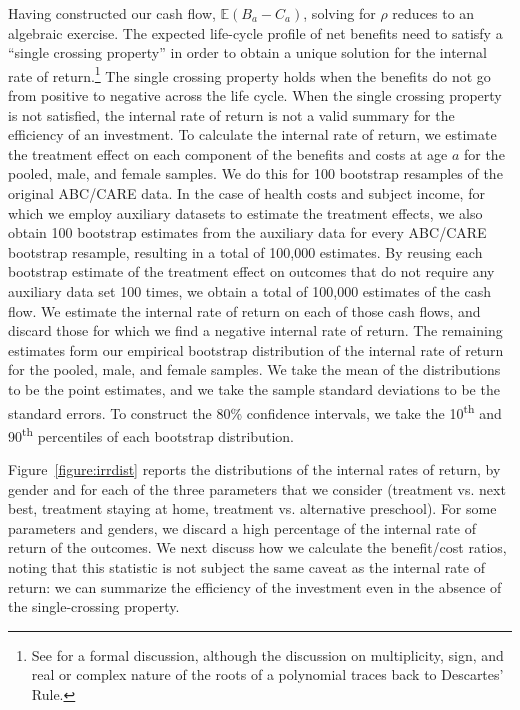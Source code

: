 \noindent Having constructed our cash flow, $\mathbb{E} (B_a - C_a)$, solving for $\rho$ reduces to an algebraic exercise. The expected life-cycle profile of net benefits need to satisfy a ``single crossing property'' in order to obtain a unique solution for the internal rate of return.\footnote{See \citet{Arrow-Levhari_1969_EJ} for a formal discussion, although the discussion on multiplicity, sign, and real or complex nature of the roots of a polynomial traces back to Descartes' Rule.} The single crossing property holds when the benefits do not go from positive to negative across the life cycle. When the single crossing property is not satisfied, the internal rate of return is not a valid summary for the efficiency of an investment. To calculate the internal rate of return, we estimate the treatment effect on each component of the benefits and costs at age $a$ for the pooled, male, and female samples. We do this for 100 bootstrap resamples of the original ABC/CARE data. In the case of health costs and subject income, for which we employ auxiliary datasets to estimate the treatment effects, we also obtain 100 bootstrap estimates from the auxiliary data for every ABC/CARE bootstrap resample, resulting in a total of 100,000 estimates. By reusing each bootstrap estimate of the treatment effect on outcomes that do not require any auxiliary data set 100 times, we obtain a total of 100,000 estimates of the cash flow. We estimate the internal rate of return on each of those cash flows, and discard those for which we find a negative internal rate of return. The remaining estimates form our empirical bootstrap distribution of the internal rate of return for the pooled, male, and female samples. We take the mean of the distributions to be the point estimates, and we take the sample standard deviations to be the standard errors. To construct the 80\% confidence intervals, we take the 10\textsuperscript{th} and 90\textsuperscript{th} percentiles of each bootstrap distribution.

\noindent Figure~\ref{figure:irrdist} reports the distributions of the internal rates of return, by gender and for each of the three parameters that we consider (treatment vs. next best, treatment staying at home, treatment vs. alternative preschool). For some parameters and genders, we discard a high percentage of the internal rate of return of the outcomes. We next discuss how we calculate the benefit/cost ratios, noting that this statistic is not subject the same caveat as the internal rate of return: we can summarize the efficiency of the investment even in the absence of the single-crossing property.

